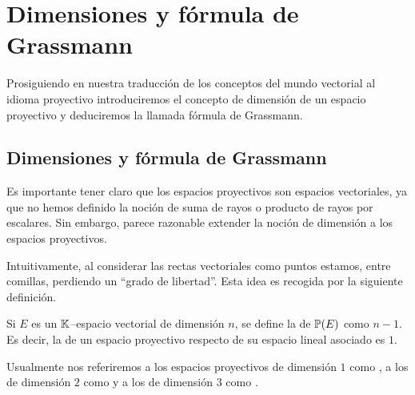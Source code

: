 \section{Dimensiones y fórmula de Grassmann}
Prosiguiendo en nuestra traducción de los conceptos del mundo vectorial al idioma proyectivo introduciremos el concepto de dimensión de un espacio proyectivo y deduciremos la llamada fórmula de Grassmann.

\subsection{Dimensiones y fórmula de Grassmann}
Es importante tener claro que los espacios proyectivos  son espacios vectoriales, ya que no hemos definido la noción de suma de rayos o producto de rayos por escalares. Sin embargo, parece razonable extender la noción de dimensión a los espacios proyectivos.

Intuitivamente, al considerar las rectas vectoriales como puntos estamos, entre comillas, perdiendo un ``grado de libertad''. Esta idea es recogida por la siguiente definición. 
\begin{defi}
	\label{epro_def_dimension}
	Si $E$ es un $\mathbb{K}$--espacio vectorial de dimensión $n$, se define la  de $\mathbb{P}(E)$ como $n-1$. Es decir, la  de un espacio proyectivo respecto de su espacio lineal asociado es $1$.
\end{defi}
Usualmente nos referiremos a los espacios proyectivos de dimensión $1$ como , a los de dimensión $2$ como  y a los de dimensión $3$ como .

